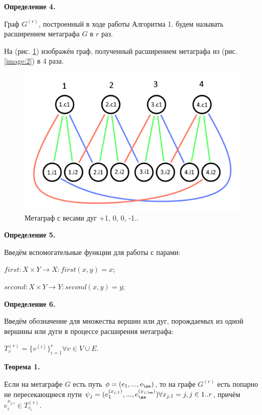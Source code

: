 \documentclass[14pt]{mmcs-article}
\begin{document}
\textbf{Определение 4.}

Граф $G^{(r)}$, построенный в ходе работы Алгоритма 1. будем называть расширением метаграфа $G$ в $r$ раз.

На (рис. \ref{image:3}) изображён граф, полученный расширением метаграфа из (рис. \ref{image:2}) в 4 раза.

\begin{figure}[H]
    \centering
    \includegraphics[scale=0.4]{Fig_1.png}
    \caption{ Метаграф с весами дуг +1, 0, 0, -1.. }
    \label{image:3}
\end{figure}

\textbf{Определение 5.}

Введём вспомогательные функции для работы с парами:

$first: X \times Y \rightarrow X: first(x, y) = x;$

$second: X \times Y \rightarrow Y: second(x, y) = y;$

\textbf{Определение 6.}

Введём обозначение для множества вершин или дуг, порождаемых из одной вершины или дуги в процессе расширения метаграфа:

$T^{(r)}_v = \{ v^{(i)} \}_{i=1}^r \forall v \in V \cup E.$



\textbf{Теорема 1.}

Если на метаграфе $G$ есть путь $\phi = (e_1, ..., e_{\ae})$, то на графе $G^{(r)}$ есть попарно не пересекающиеся пути $\psi_j = (e^{(x_{j, 1})}_1, ..., e^{(x_{j, \ae})}_{\ae})\forall x_{j, 1} = j, j \in 1..r$, причём $e^{x_{j, i}}_i \in T^{(r)}_{e_i}$.
\end{document}
